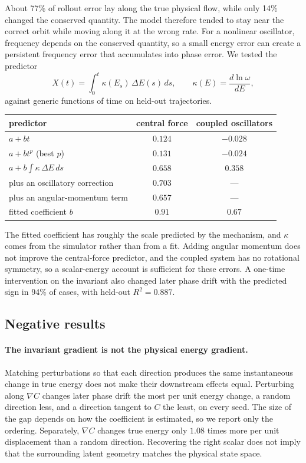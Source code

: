 About 77\% of rollout error lay along the true physical flow, while only 14\% changed the conserved
quantity. The model therefore tended to stay near the correct orbit while moving along it at the
wrong rate. For a nonlinear oscillator, frequency depends on the conserved quantity, so a small
energy error can create a persistent frequency error that accumulates into phase error. We tested
the predictor
\begin{equation*}
X(t) = \int_0^t \kappa(E_s)\,\Delta E(s)\,ds, \qquad \kappa(E) = \frac{d\ln\omega}{dE},
\end{equation*}
against generic functions of time on held-out trajectories.

\begin{center}\small
\begin{tabular}{lcc}
\toprule
predictor & central force & coupled oscillators \\
\midrule
$a + bt$ & $0.124$ & $-0.028$ \\
$a + bt^p$ (best $p$) & $0.131$ & $-0.024$ \\
$a + b\int\kappa\,\Delta E\,ds$ & $\mathbf{0.658}$ & $\mathbf{0.358}$ \\
\quad plus an oscillatory correction & $0.703$ & --- \\
\quad plus an angular-momentum term & $0.657$ & --- \\
fitted coefficient $b$ & $0.91$ & $0.67$ \\
\bottomrule
\end{tabular}
\end{center}

The fitted coefficient has roughly the scale predicted by the mechanism, and $\kappa$ comes from the
simulator rather than from a fit. Adding angular momentum does not improve the central-force
predictor, and the coupled system has no rotational symmetry, so a scalar-energy account is
sufficient for these errors. A one-time intervention on the invariant also changed later phase drift
with the predicted sign in 94\% of cases, with held-out $R^2 = 0.887$.

\subsection{Negative results}

\paragraph{The invariant gradient is not the physical energy gradient.} Matching perturbations so
that each direction produces the same instantaneous change in true energy does not make their
downstream effects equal. Perturbing along $\nabla C$ changes later phase drift the most per unit
energy change, a random direction less, and a direction tangent to $C$ the least, on every seed. The
size of the gap depends on how the coefficient is estimated, so we report only the ordering.
Separately, $\nabla C$ changes true energy only $1.08$ times more per unit displacement than a random
direction. Recovering the right scalar does not imply that the surrounding latent geometry matches
the physical state space.

